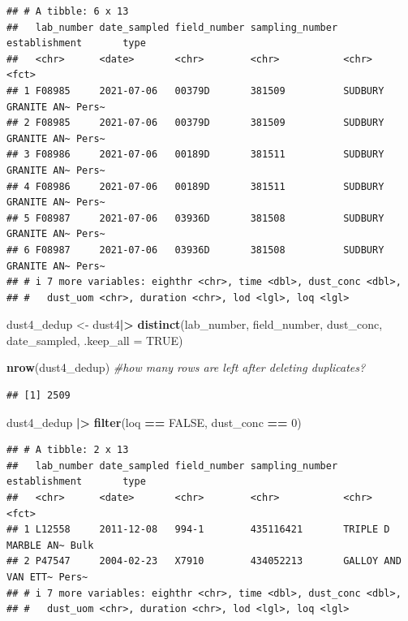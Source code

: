 \documentclass[
]{article}
\newenvironment{Shaded}{\begin{snugshade}}{\end{snugshade}}
\newcommand{\AttributeTok}[1]{\textcolor[rgb]{0.13,0.29,0.53}{#1}}
\newcommand{\CommentTok}[1]{\textcolor[rgb]{0.56,0.35,0.01}{\textit{#1}}}
\newcommand{\ConstantTok}[1]{\textcolor[rgb]{0.56,0.35,0.01}{#1}}
\newcommand{\DecValTok}[1]{\textcolor[rgb]{0.00,0.00,0.81}{#1}}
\newcommand{\FunctionTok}[1]{\textcolor[rgb]{0.13,0.29,0.53}{\textbf{#1}}}
\newcommand{\NormalTok}[1]{#1}
\newcommand{\OtherTok}[1]{\textcolor[rgb]{0.56,0.35,0.01}{#1}}
\newcommand{\SpecialCharTok}[1]{\textcolor[rgb]{0.81,0.36,0.00}{\textbf{#1}}}
\begin{document}
\begin{verbatim}
## # A tibble: 6 x 13
##   lab_number date_sampled field_number sampling_number establishment       type 
##   <chr>      <date>       <chr>        <chr>           <chr>               <fct>
## 1 F08985     2021-07-06   00379D       381509          SUDBURY GRANITE AN~ Pers~
## 2 F08985     2021-07-06   00379D       381509          SUDBURY GRANITE AN~ Pers~
## 3 F08986     2021-07-06   00189D       381511          SUDBURY GRANITE AN~ Pers~
## 4 F08986     2021-07-06   00189D       381511          SUDBURY GRANITE AN~ Pers~
## 5 F08987     2021-07-06   03936D       381508          SUDBURY GRANITE AN~ Pers~
## 6 F08987     2021-07-06   03936D       381508          SUDBURY GRANITE AN~ Pers~
## # i 7 more variables: eighthr <chr>, time <dbl>, dust_conc <dbl>,
## #   dust_uom <chr>, duration <chr>, lod <lgl>, loq <lgl>
\end{verbatim}

\begin{Shaded}
\begin{Highlighting}[]
\NormalTok{dust4\_dedup }\OtherTok{\textless{}{-}}\NormalTok{ dust4}\SpecialCharTok{|\textgreater{}} 
  \FunctionTok{distinct}\NormalTok{(lab\_number, field\_number, dust\_conc, date\_sampled, }
           \AttributeTok{.keep\_all =} \ConstantTok{TRUE}\NormalTok{) }

\FunctionTok{nrow}\NormalTok{(dust4\_dedup) }\CommentTok{\#how many rows are left after deleting duplicates?   }
\end{Highlighting}
\end{Shaded}

\begin{verbatim}
## [1] 2509
\end{verbatim}

\begin{Shaded}
\begin{Highlighting}[]
\NormalTok{dust4\_dedup }\SpecialCharTok{|\textgreater{}} 
  \FunctionTok{filter}\NormalTok{(loq }\SpecialCharTok{==} \ConstantTok{FALSE}\NormalTok{, }
\NormalTok{         dust\_conc }\SpecialCharTok{==} \DecValTok{0}\NormalTok{)}
\end{Highlighting}
\end{Shaded}

\begin{verbatim}
## # A tibble: 2 x 13
##   lab_number date_sampled field_number sampling_number establishment       type 
##   <chr>      <date>       <chr>        <chr>           <chr>               <fct>
## 1 L12558     2011-12-08   994-1        435116421       TRIPLE D MARBLE AN~ Bulk 
## 2 P47547     2004-02-23   X7910        434052213       GALLOY AND VAN ETT~ Pers~
## # i 7 more variables: eighthr <chr>, time <dbl>, dust_conc <dbl>,
## #   dust_uom <chr>, duration <chr>, lod <lgl>, loq <lgl>
\end{verbatim}
\end{document}
